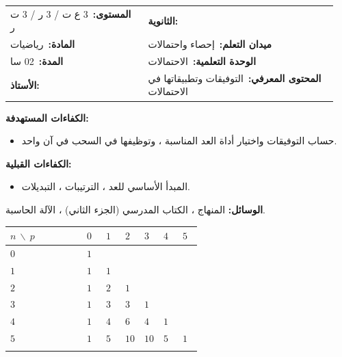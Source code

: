 \documentclass[12pt,a4paper]{article}
\makeatletter
\newenvironment{LTR}{\begin{otherlanguage}{english}}{\end{otherlanguage}}
\newcommand{\ar}[1]{\foreignlanguage{arabic}{#1}}
\newcommand{\Phase}[1]{\textbf{#1}}
\newcommand{\Fld}[2]{\textbf{#1:}\ #2}
\newcommand{\ModhHead}[9]{%
\begin{LTR}
\begin{tcolorbox}[enhanced,colback=white,colframe=cThm!85!black,arc=4mm,boxrule=1pt,top=14pt,bottom=6pt,left=8pt,right=8pt,
 overlay={\node[fill=cThm!85!black,text=white,rounded corners=3mm,inner xsep=14pt,inner ysep=4pt,font=\large\bfseries] at ([yshift=0pt]frame.north){\ar{مذكرة رقم #1}};},
 before upper={\selectlanguage{arabic}}]
\begin{tabular}{@{}p{0.4\linewidth}p{0.55\linewidth}@{}}
\Fld{المستوى}{#2} & \Fld{الثانوية}{\dotfill}\\[3pt]
\Fld{المادة}{رياضيات} & \Fld{ميدان التعلم}{#3}\\[3pt]
\Fld{المدة}{#5} & \Fld{الوحدة التعلمية}{#4}\\[3pt]
\Fld{الأستاذ}{\dotfill} & \Fld{المحتوى المعرفي}{#6}\\
\end{tabular}
\end{tcolorbox}
\begin{tcolorbox}[enhanced,colback=white,colframe=cThm!85!black,arc=3mm,boxrule=0.8pt,sidebyside,sidebyside align=top,lefthand ratio=0.5,
 segmentation style={dashed,cThm!60},before upper={\selectlanguage{arabic}},before lower={\selectlanguage{arabic}}]
\textbf{الكفاءات المستهدفة:}\par #8
\tcblower
\textbf{الكفاءات القبلية:}\par #7
\end{tcolorbox}
\end{LTR}
\par\smallskip\textbf{الوسائل:} #9\par\smallskip}
\newenvironment{Sayr}{%
\begin{LTR}\renewcommand{\arraystretch}{1.25}\setlength{\tabcolsep}{4pt}\relpenalty=10000\binoppenalty=10000\tolerance=9000\emergencystretch=0.3\linewidth
\begin{longtable}{|p{0.09\textwidth}|>{\centering\arraybackslash}p{0.05\textwidth}|p{0.71\textwidth}|>{\centering\arraybackslash}p{0.09\textwidth}|}
\hline\rowcolor{cThm!12}\ar{\footnotesize\textbf{توجيهات وتعاليق}} & \ar{\footnotesize\textbf{المدة}} & \ar{\textbf{سير الحصة}} & \ar{\footnotesize\textbf{مراحل الحصة}}\\\hline\endhead
\hline\endfoot}{\end{longtable}\end{LTR}}
\newcommand{\RaggedEnd}{\leftskip=0pt plus 1fil\relax}
\newcommand{\Row}[4]{\ar{\small #4} & \ar{#3} & \ar{\RaggedEnd #2} & \cellcolor{cThm!8}\ar{\Phase{#1}}\\\hline}
\newcommand{\Lab}[2]{\foreignlanguage{english}{\tcbox[on line,colback=#1,colframe=#1,boxrule=0pt,arc=2pt,boxsep=1pt,left=5pt,right=5pt,top=1pt,bottom=1pt]{\ar{\textcolor{white}{\textbf{#2}}}}}}
\newcommand{\RR}[1]{\ifmmode{\color{cThm}#1}\else$\mbox{\color{cThm}#1}$\fi}
\providecommand{\LW}[1]{{\color{cDef}#1}}
\makeatother
\begin{document}
\newpage
\ModhHead{51}{3 ع ت / 3 ر / 3 ت ر}{إحصاء واحتمالات}{الاحتمالات}{02 سا}{التوفيقات وتطبيقاتها في الاحتمالات}%
{\begin{itemize}\item المبدأ الأساسي للعد ، الترتيبات ، التبديلات.\end{itemize}}%
{\begin{itemize}\item حساب التوفيقات واختيار أداة العد المناسبة ، وتوظيفها في السحب في آن واحد.\end{itemize}}%
{المنهاج ، الكتاب المدرسي (الجزء الثاني) ، الآلة الحاسبة.}
\begin{Sayr}
\Row{مرحلة الانطلاق}{%
\textbf{التهيئة النفسية:} بكم طريقة نختار $3$ تلاميذ من $10$ لتمثيل القسم؟}{10 د}{وضعية القسم.}
\Row{التشخيص والاكتشاف}{%
\Lab{cEx}{نشاط رقم 06}\par\textbf{(1)} كم ترتيبة لـ $3$ تلاميذ من $10$ ؟\par\textbf{(2)} كل مجموعة من $3$ تلاميذ تظهر كم مرة بين الترتيبات؟\par\textbf{(3)} استنتج عدد المجموعات.}{35 د}{من الترتيبات إلى التوفيقات.}
\Row{}{%
\Lab{cDef}{مناقشة النشاط}\par\textbf{(1)} $A_{10}^3=10\times9\times8=\RR{720}$.\par\textbf{(2)} كل مجموعة تظهر $3!=6$ مرات (ترتيب عناصرها).\par\textbf{(3)} $\dfrac{720}{6}=\RR{120}$ مجموعة.}{}{}
\Row{بناء المعارف}{%
\Lab{cDef}{تعريف}\ عدد المجموعات الجزئية ذات $\LW{p}$ عنصرًا من مجموعة ذات $\LW{n}$ عنصرًا: \par $\LW{\RR{\binom np=\dfrac{A_n^p}{p!}=\dfrac{n!}{p!\,(n-p)!}}}$.}{50 د}{الحاسبة (nCr).}
\Row{}{%
\Lab{cThm}{خاصية}\par\textbf{(1)} $\binom n0=\binom nn=1$ ؛ \quad $\binom np=\binom n{n-p}$.\par\textbf{(2)} $\binom np+\binom n{p+1}=\binom{n+1}{p+1}$ (مثلث باسكال):\par\smallskip\begin{LTR}\centering{\renewcommand{\arraystretch}{1.45}\setlength{\tabcolsep}{2pt}\begin{tabular}{|>{\centering\arraybackslash}p{0.260\linewidth}|>{\centering\arraybackslash}p{0.100\linewidth}|>{\centering\arraybackslash}p{0.100\linewidth}|>{\centering\arraybackslash}p{0.100\linewidth}|>{\centering\arraybackslash}p{0.100\linewidth}|>{\centering\arraybackslash}p{0.100\linewidth}|>{\centering\arraybackslash}p{0.100\linewidth}|}\hline\rowcolor{cSec!12}$n\ \backslash\ p$ & $0$ & $1$ & $2$ & $3$ & $4$ & $5$\\\hline $0$ & $1$ &  &  &  &  & \\\hline $1$ & $1$ & $1$ &  &  &  & \\\hline $2$ & $1$ & $2$ & $1$ &  &  & \\\hline $3$ & $1$ & $3$ & $3$ & $1$ &  & \\\hline $4$ & $1$ & $4$ & $6$ & $4$ & $1$ & \\\hline $5$ & $1$ & $5$ & $10$ & $10$ & $5$ & $1$\\\hline \end{tabular}}\end{LTR}\par }{}{}

\end{Sayr}
\end{document}
